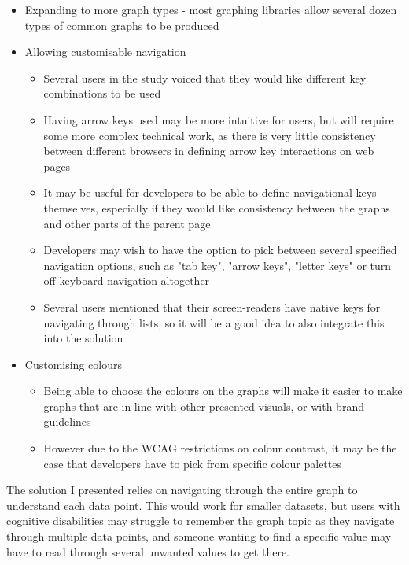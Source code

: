 \documentclass[ %
                    author={Aleena Baig},
                supervisor={Dr Simon Lock},
                    degree={BSc},
                     title={On Making Web Accessible Graphs},
                  subtitle={},
                      year={2019} ]{dissertation}
\begin{document}
\begin{itemize}
    \item Expanding to more graph types - most graphing libraries allow several dozen types of common graphs to be produced
    \item Allowing customisable navigation
        \begin{itemize}
            \item Several users in the study voiced that they would like different key combinations to be used
            \item Having arrow keys used may be more intuitive for users, but will require some more complex technical work, as there is very little consistency between different browsers in defining arrow key interactions on web pages
            \item It may be useful for developers to be able to define navigational keys themselves, especially if they would like consistency between the graphs and other parts of the parent page
            \item Developers may wish to have the option to pick between several specified navigation options, such as "tab key", "arrow keys", "letter keys" or turn off keyboard navigation altogether
            \item Several users mentioned that their screen-readers have native keys for navigating through lists, so it will be a good idea to also integrate this into the solution
        \end{itemize}
    \item Customising colours
        \begin{itemize}
            \item Being able to choose the colours on the graphs will make it easier to make graphs that are in line with other presented visuals, or with brand guidelines
            \item However due to the WCAG restrictions on colour contrast, it may be the case that developers have to pick from specific colour palettes
        \end{itemize}
\end{itemize}

The solution I presented relies on navigating through the entire graph to understand each data point. This would work for smaller datasets, but users with cognitive disabilities may struggle to remember the graph topic as they navigate through multiple data points, and someone wanting to find a specific value may have to read through several unwanted values to get there.
\end{document}
